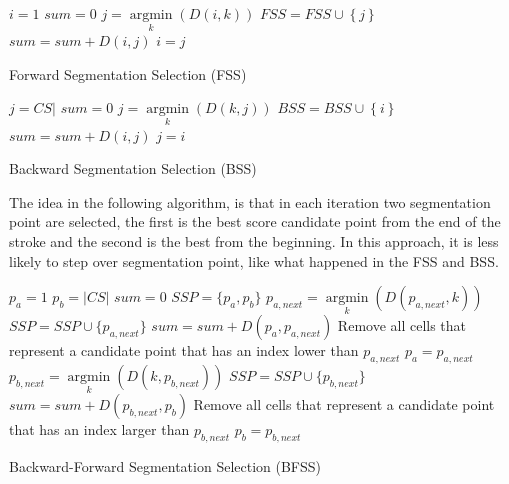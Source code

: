 \documentclass[journal,compsoc]{IEEEtran}
\begin{document}

\begin{algorithm}
$i=1$\;
$sum=0$\;
{
	$j = \mathop {\arg \min }\limits_k \left( {D\left( {i,k} \right)} \right)$\;
	$FSS = FSS \cup \left\{ j \right\}$\;
	$sum = sum + D\left( {i,j} \right)$\;
	$i=j$\;
}
\caption{Forward Segmentation Selection (FSS)}
\label{alg:fss}
\end{algorithm}



\begin{algorithm}
$j={CS|}$\;
$sum=0$\;
{
	$j = \mathop {\arg \min }\limits_k \left( {D\left( {k,j} \right)} \right)$\;
	$BSS = BSS \cup \left\{ i \right\}$\;
	$sum = sum + D\left( {i,j} \right)$\;
	$j=i$\;
}
\caption{Backward Segmentation Selection (BSS)}
\label{alg:bss}
\end{algorithm}


The idea in the following algorithm, is that in each iteration two segmentation point are selected, the first is the best score candidate point from the end of the stroke and the second is the best from the beginning. In this approach, it is less likely to step over segmentation point, like what happened in the FSS and BSS.

\begin{algorithm}
$p_{a}=1$\;
$p_{b}=|CS|$\;
$sum=0$\;
$SSP=\{p_{a},p_{b}\}$\;
{
	$p_{a,next} = \mathop {\arg \min}\limits_k (D(p_{a,next},k))$\;
	$SSP = SSP \cup \{p_{a,next}\}$\;
	$sum = sum + D(p_a,p_{a,next})$\;
	Remove all cells that represent a candidate point that has an index lower than $p_{a,next}$\;
	$p_{a}=p_{a,next}$\;
	$p_{b,next} = \mathop {\arg \min}\limits_k (D(k,p_{b,next}))$\;
	$SSP = SSP \cup \{p_{b,next}\}$\;
	$sum = sum + D(p_{b,next},p_b)$\;
	Remove all cells that represent a candidate point that has an index larger than  $p_{b,next}$\;
	$p_{b}=p_{b,next}$\;
}
\caption{Backward-Forward Segmentation Selection (BFSS)}
\label{alg:bfss}
\end{algorithm}
\end{document}
